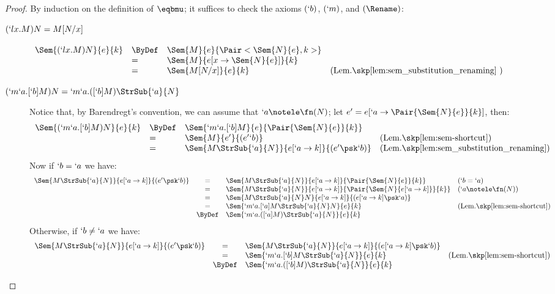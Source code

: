 \documentclass{lmcs}
\begin{document}
 \begin{proof} By induction on the definition of $\eqbmu$; it suffices to check the axioms $(`b)$, $(`m)$, and $(\Rename)$:

 \begin{description}

 \item [$ {(`lx.M)N = M[N/x] } $] 
$ \begin{array}[t]{lll@{\quad}l}
 \Sem{ (`lx.M)N }{ e }{ k } 
	&\ByDef& 
 \Sem{ M }{ e }{ \Pair< \Sem{ N }{ e } , k >} \\
	&=& 
 \Sem{ M }{ e[x \to \Sem{ N }{ e }] }{ k } \\
	&=& 
 \Sem{ M[N/x] }{ e }{ k } & (\textrm{Lem.\skp\ref{lem:sem_substitution_renaming} }) 
 \end{array} $

 \item [{$(`m`a.[`b]M)N = `m`a.([`b]M) \StrSub{`a} {N} $}] 
Notice that, by Barendregt's convention, we can assume that $`a \notele \fn(N)$; let $e' = e[`a \to \Pair{\Sem{ N }{ e } }{ k }]$, then:
%
 \[ \begin{array}[t]{lll@{\quad}l}
 \Sem{ (`m`a.[`b]M)N }{ e }{ k } 
	&\ByDef& \Sem{ `m`a.[`b]M }{ e }{ \Pair{\Sem{ N }{ e } }{ k } } \\
	&=& \Sem{ M }{ e' }{ (e' `b) } & (\textrm{Lem.\skp\ref{lem:sem-shortcut}}) \\
	&=& \Sem{ M\StrSub{`a}{N} }{ e[`a\to k] }{ (e' \psk `b) } 
& (\textrm{Lem.\skp\ref{lem:sem_substitution_renaming}} ) 
 \end{array} \]
Now if $`b = `a$ we have:
%
 \[ \begin{array}{rcl@{\quad}l}
 \Sem{ M\StrSub{`a}{N} }{ e[`a\to k] }{ (e' \psk `b) } 
	& = & \Sem{ M\StrSub{`a}{N} }{ e[`a\to k] }{ \Pair{\Sem{ N }{ e } }{ k } } & (`b = `a) \\
	& = & \Sem{ M\StrSub{`a}{N} }{ e[`a\to k] }{ \Pair{\Sem{ N }{ e [`a\to k] } }{ k } } & (`a\notele \fn(N)) \\
	& = & \Sem{ M\StrSub{`a}{N}N }{ e[`a\to k] }{ (e[`a\to k]\psk`a) } \\
	& = & \Sem{ `m`a.[`a]M\StrSub{`a}{N} N }{ e }{ k } & (\textrm{Lem.\skp\ref{lem:sem-shortcut}}) \\
	&\ByDef& \Sem{ `m`a.([`a]M) \StrSub{`a} {N} }{ e }{ k }
 \end{array} \]
%
Otherwise, if $`b \neq `a$ we have:
%
 \[ \begin{array}{rcl@{\quad}l}
 \Sem{ M\StrSub{`a}{N} }{ e[`a\to k] }{ (e' \psk `b) } 
	& = & \Sem{ M\StrSub{`a}{N} }{ e[`a\to k] }{ (e[`a \to k] \psk `b) } \\
	& = & \Sem{ `m`a.[`b]M \StrSub{`a}{N} }{ e }{ k } & (\textrm{Lem.\skp\ref{lem:sem-shortcut}}) \\
	&\ByDef& \Sem{ `m`a.([`b]M) \StrSub{`a} {N} }{ e }{ k } 
 \end{array} \]


\end{description}
\end{proof}
\end{document}
